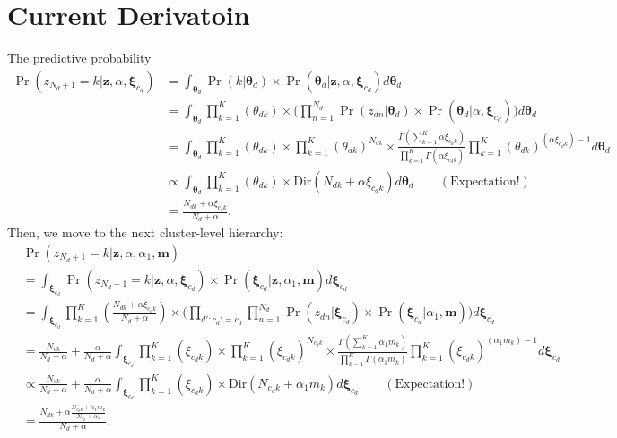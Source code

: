 \documentclass[12pt]{article}
\begin{document}
\section{Current Derivatoin}
The predictive probability
\begin{equation}
\begin{aligned}
\Pr(z_{N_d+1} = k|\boldsymbol{z}, \alpha, \boldsymbol{\xi}_{c_d} ) &= \int_{\boldsymbol{\theta}_d} \Pr(k|\boldsymbol{\theta}_d)\times\Pr(\boldsymbol{\theta}_d|\boldsymbol{z}, \alpha, \boldsymbol{\xi}_{c_d} )d\boldsymbol{\theta}_d \\&=\int_{\boldsymbol{\theta}_d} \prod_{k=1}^K
(\theta_{dk})\times
\Big(\prod_{n=1}^{N_d}\Pr(z_{dn}|\boldsymbol{\theta}_d) \times \Pr(\boldsymbol{\theta}_d|\alpha, \boldsymbol{\xi}_{c_d}) \Big)d\boldsymbol{\theta}_d \\& = 
\int_{\boldsymbol{\theta}_d}\prod_{k=1}^K
(\theta_{dk})\times \prod_{k=1}^K(\theta_{dk})^{N_{dk}}\times\frac{\Gamma(\sum_{k=1}^K \alpha \xi_{c_dk})}{\prod_{k=1}^K\Gamma(\alpha\xi_{c_dk})}\prod_{k=1}^K (\theta_{dk})^{(\alpha\xi_{c_dk})-1}d\boldsymbol{\theta}_d\\& \propto
\int_{\boldsymbol{\theta}_d}\prod_{k=1}^K
(\theta_{dk})\times \mbox{Dir}(N_{dk}+\alpha\xi_{c_dk})d\boldsymbol{\theta}_d \quad\quad (\mbox{Expectation!})
\\& = \frac{N_{dk}+\alpha\xi_{c_dk}}{N_d + \alpha}.
\end{aligned}
\end{equation}
Then, we move to the next cluster-level hierarchy:
\begin{equation}
\begin{aligned}
&\Pr(z_{N_d+1} = k|\boldsymbol{z}, \alpha, \alpha_1, \boldsymbol{m}) \\&= \int_{\boldsymbol{\xi}_{c_d}} \Pr(z_{N_d+1} = k|\boldsymbol{z}, \alpha, \boldsymbol{\xi}_{c_d} )\times\Pr(\boldsymbol{\xi}_{c_d}|\boldsymbol{z}, \alpha_1, \boldsymbol{m})d\boldsymbol{\xi}_{c_d}\\&=\int_{\boldsymbol{\xi}_{c_d}} \prod_{k=1}^K
( \frac{N_{dk}+\alpha\xi_{c_dk}}{N_d + \alpha})\times
\Big(\prod_{d':c_d'=c_d}\prod_{n=1}^{N_d}\Pr(z_{dn}|\boldsymbol{\xi}_{c_d}) \times \Pr(\boldsymbol{\xi}_{c_d}|\alpha_1, \boldsymbol{m}) \Big)d\boldsymbol{\xi}_{c_d}\\& 
 = \frac{N_{dk}}{N_d + \alpha}+\frac{\alpha}{{N_d + \alpha}}\int_{\boldsymbol{\xi}_{c_d}} \prod_{k=1}^K
 ( \xi_{c_dk})\times
 \prod_{k=1}^K ({\xi}_{c_dk})^{N_{c_dk}}\times \frac{\Gamma(\sum_{k=1}^K \alpha_1 m_{k})}{\prod_{k=1}^K\Gamma(\alpha_1m_{k})}\prod_{k=1}^K (\xi_{c_dk})^{(\alpha_1m_{k})-1}d\boldsymbol{\xi}_{c_d}\\&
\propto \frac{N_{dk}}{N_d + \alpha}+\frac{\alpha}{{N_d + \alpha}}
\int_{\boldsymbol{\xi}_{c_d}}\prod_{k=1}^K
(\xi_{c_dk})\times \mbox{Dir}(N_{c_dk}+\alpha_1m_{k})d\boldsymbol{\xi}_{c_d} \quad\quad (\mbox{Expectation!})
\\& = \frac{N_{dk}+\alpha\frac{N_{c_dk}+\alpha_1m_k}{N_{c_d}+\alpha_1}}{N_d + \alpha}.
\end{aligned}
\end{equation}
\end{document}
